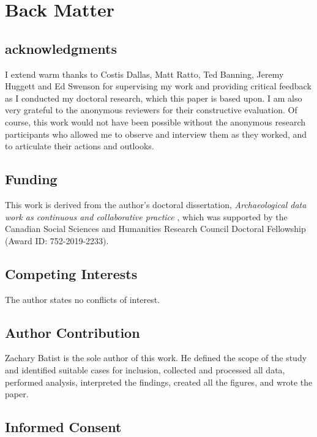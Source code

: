 \documentclass[
]{article}
\author{}
\date{}
\begin{document}
\section{Back Matter}\label{back-matter}

\subsection{acknowledgments}\label{acknowledgments}

I extend warm thanks to Costis Dallas, Matt Ratto, Ted Banning, Jeremy
Huggett and Ed Swenson for supervising my work and providing critical
feedback as I conducted my doctoral research, which this paper is based
upon. I am also very grateful to the anonymous reviewers for their
constructive evaluation. Of course, this work would not have been
possible without the anonymous research participants who allowed me to
observe and interview them as they worked, and to articulate their
actions and outlooks.

\subsection{Funding}\label{funding}

This work is derived from the author's doctoral dissertation,
\emph{Archaeological data work as continuous and collaborative practice}
\autocite{batist2023a}, which was supported by the Canadian Social
Sciences and Humanities Research Council Doctoral Fellowship (Award ID:
752-2019-2233).

\subsection{Competing Interests}\label{competing-interests}

The author states no conflicts of interest.

\subsection{Author Contribution}\label{author-contribution}

Zachary Batist is the sole author of this work. He defined the scope of
the study and identified suitable cases for inclusion, collected and
processed all data, performed analysis, interpreted the findings,
created all the figures, and wrote the paper.

\subsection{Informed Consent}\label{informed-consent}
\end{document}
